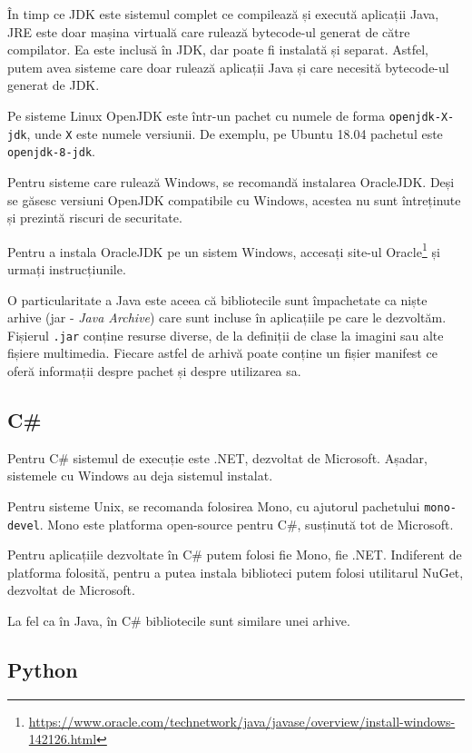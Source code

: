 În timp ce JDK este sistemul complet ce compilează și execută aplicații Java, JRE este doar mașina virtuală care rulează bytecode-ul generat de către compilator.
Ea este inclusă în JDK, dar poate fi instalată și separat.
Astfel, putem avea sisteme care doar rulează aplicații Java și care necesită bytecode-ul generat de JDK.

Pe sisteme Linux OpenJDK este într-un pachet cu numele de forma \texttt{openjdk-X-jdk}, unde \texttt{X} este numele versiunii.
De exemplu, pe Ubuntu 18.04 pachetul este \texttt{openjdk-8-jdk}.

Pentru sisteme care rulează Windows, se recomandă instalarea OracleJDK.
Deși se găsesc versiuni OpenJDK compatibile cu Windows, acestea nu sunt întreținute și prezintă riscuri de securitate.

Pentru a instala OracleJDK pe un sistem Windows, accesați site-ul Oracle\footnote{\url{https://www.oracle.com/technetwork/java/javase/overview/install-windows-142126.html}} și urmați instrucțiunile.

O particularitate a Java este aceea că bibliotecile sunt împachetate ca niște arhive (jar  - \textit{Java Archive}) care sunt incluse în aplicațiile pe care le dezvoltăm.
Fișierul \texttt{.jar} conține resurse diverse, de la definiții de clase la imagini sau alte fișiere multimedia.
Fiecare astfel de arhivă poate conține un fișier manifest ce oferă informații despre pachet și despre utilizarea sa.

\subsection{C\#}
\label{sec:appdev:dev-env:csharp}

Pentru C\# sistemul de execuție este .NET, dezvoltat de Microsoft.
Așadar, sistemele cu Windows au deja sistemul instalat.

Pentru sisteme Unix, se recomanda folosirea Mono, cu ajutorul pachetului \texttt{mono-devel}.
Mono este platforma open-source pentru C\#, susținută tot de Microsoft.

Pentru aplicațiile dezvoltate în C\# putem folosi fie Mono, fie .NET.
Indiferent de platforma folosită, pentru a putea instala biblioteci putem folosi utilitarul NuGet, dezvoltat de Microsoft.

La fel ca în Java, în C\# bibliotecile sunt similare unei arhive.

\subsection{Python}
\label{sec:appdev:dev-env:python}


